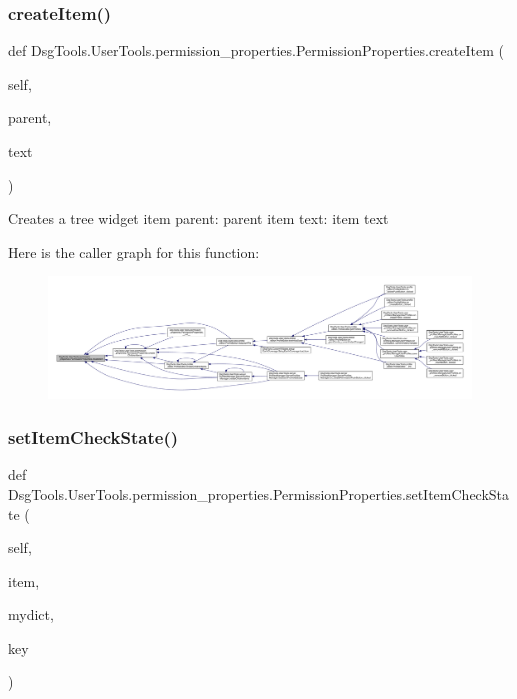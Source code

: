 \subsubsection{\texorpdfstring{create\+Item()}{createItem()}}
{\footnotesize\ttfamily def Dsg\+Tools.\+User\+Tools.\+permission\+\_\+properties.\+Permission\+Properties.\+create\+Item (\begin{DoxyParamCaption}\item[{}]{self,  }\item[{}]{parent,  }\item[{}]{text }\end{DoxyParamCaption})}

\begin{DoxyVerb}Creates a tree widget item
parent: parent item
text: item text
\end{DoxyVerb}
 Here is the caller graph for this function\+:
\nopagebreak
\begin{figure}[H]
\begin{center}
\leavevmode
\includegraphics[width=350pt]{class_dsg_tools_1_1_user_tools_1_1permission__properties_1_1_permission_properties_ab5156b62b30098783bef4e10891632ff_icgraph}
\end{center}
\end{figure}
\mbox{\label{class_dsg_tools_1_1_user_tools_1_1permission__properties_1_1_permission_properties_af518c4af5cbbd1ebe029ba00dd896659}} 
\subsubsection{\texorpdfstring{set\+Item\+Check\+State()}{setItemCheckState()}}
{\footnotesize\ttfamily def Dsg\+Tools.\+User\+Tools.\+permission\+\_\+properties.\+Permission\+Properties.\+set\+Item\+Check\+State (\begin{DoxyParamCaption}\item[{}]{self,  }\item[{}]{item,  }\item[{}]{mydict,  }\item[{}]{key }\end{DoxyParamCaption})}

